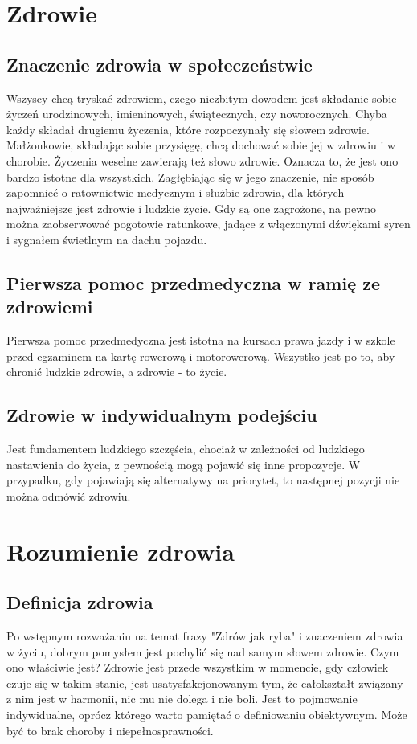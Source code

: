 \documentclass[11pt,a4paper]{article}
\begin{document}
\section{Zdrowie}
\subsection{Znaczenie zdrowia w społeczeństwie}
Wszyscy chcą tryskać zdrowiem, czego niezbitym dowodem jest składanie sobie życzeń urodzinowych, imieninowych, świątecznych, czy noworocznych. Chyba każdy składał drugiemu życzenia, które rozpoczynały się słowem zdrowie. Małżonkowie, składając sobie przysięgę, chcą dochować sobie jej w zdrowiu i w chorobie. Życzenia weselne zawierają też słowo zdrowie. Oznacza to, że jest ono bardzo istotne dla wszystkich. Zagłębiając się w jego znaczenie, nie sposób zapomnieć o ratownictwie medycznym i służbie zdrowia, dla których najważniejsze jest zdrowie i ludzkie życie. Gdy są one zagrożone, na pewno można zaobserwować pogotowie ratunkowe, jadące z włączonymi dźwiękami syren i sygnałem świetlnym na dachu pojazdu. 

\subsection{Pierwsza pomoc przedmedyczna w ramię ze zdrowiemi}
Pierwsza pomoc przedmedyczna jest istotna na kursach prawa jazdy i w szkole przed egzaminem na kartę rowerową i motorowerową. Wszystko jest po to, aby chronić ludzkie zdrowie, a zdrowie - to życie. 

\subsection{Zdrowie w indywidualnym podejściu}
Jest fundamentem ludzkiego szczęścia, chociaż w zależności od ludzkiego nastawienia do życia, z pewnością mogą pojawić się inne propozycje. W przypadku, gdy pojawiają się alternatywy na priorytet, to następnej pozycji nie można odmówić zdrowiu.

\section{Rozumienie zdrowia}
\subsection{Definicja zdrowia}
Po wstępnym rozważaniu na temat frazy "Zdrów jak ryba" i znaczeniem zdrowia w życiu, dobrym pomysłem jest pochylić się nad samym słowem zdrowie. Czym ono właściwie jest? Zdrowie jest przede wszystkim w momencie, gdy człowiek czuje się w takim stanie, jest usatysfakcjonowanym tym, że całokształt związany z nim jest w harmonii, nic mu nie dolega i nie boli. Jest to pojmowanie indywidualne, oprócz którego warto pamiętać o definiowaniu obiektywnym. Może być to brak choroby i niepełnosprawności.
\end{document}
